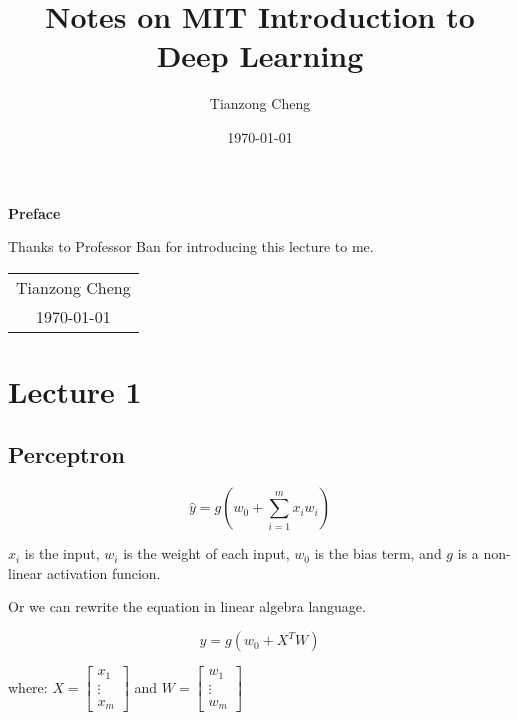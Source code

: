 \documentclass[12pt, a4paper, oneside]{article}
\title{{\Huge{\textbf{Notes on MIT Introduction to Deep Learning}}}}
\author{Tianzong Cheng}
\date{\today}
\begin{document}
\maketitle
\thispagestyle{empty}

\newpage
\thispagestyle{empty}
\begin{center}
    \Huge\textbf{Preface}
\end{center}
Thanks to Professor Ban for introducing this lecture to me.
\begin{flushright}
    \begin{tabular}{c}
        Tianzong Cheng \\
        \today
    \end{tabular}
\end{flushright}

\newpage
{}
\setcounter{page}{1}
\tableofcontents

\newpage
\setcounter{page}{1}

\section{Lecture 1}

\subsection{Perceptron}

\begin{equation}
    \hat{y}=g(w_{0}+\sum_{i=1}^{m}x_{i}w_{i})
\end{equation}

$x_{i}$ is the input, $w_{i}$ is the weight of each input, $w_{0}$ is the bias term, and $g$ is a non-linear activation funcion.

Or we can rewrite the equation in linear algebra language.

\begin{equation}
    \hat{y} = g(w_{0}+X^{T}W)
\end{equation}

where: $X=\begin{bmatrix}
        x_{1}  \\
        \vdots \\
        x_{m}
    \end{bmatrix}$ and $W=\begin{bmatrix}
        w_{1}  \\
        \vdots \\
        w_{m}
    \end{bmatrix}$
\end{document}
